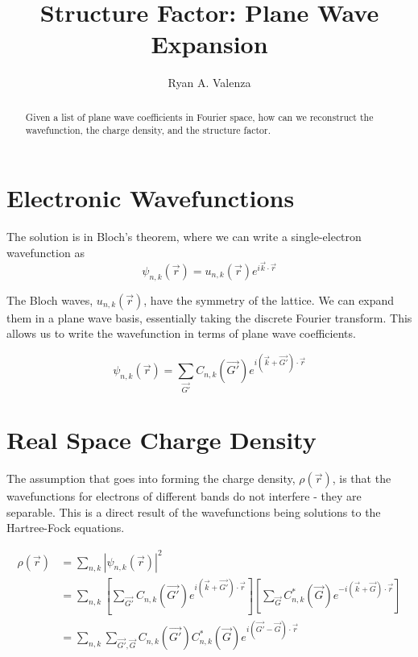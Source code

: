 \documentclass[notitlepage,letter,preprint,prb]{revtex4}
\begin{document}
	\title{Structure Factor: Plane Wave Expansion}
	\author{Ryan A. Valenza}
\nopagebreak
\begin{abstract}
	Given a list of plane wave coefficients in Fourier space, how can we reconstruct the wavefunction, the charge density, and the structure factor.
\end{abstract}
\maketitle 

\section{Electronic Wavefunctions}
	The solution is in Bloch's theorem, where we can write a single-electron wavefunction as
	\begin{equation}
	\psi_{n,k}(\vec{r}) = u_{n,k}(\vec{r})e^{i\vec{k}\cdot\vec{r}}
	\end{equation}
	
	The Bloch waves, $u_{n,k}(\vec{r})$, have the symmetry of the lattice.  We can expand them in a plane wave basis, essentially taking the discrete Fourier transform.  This allows us to write the wavefunction in terms of plane wave coefficients.
	
	\begin{equation}
	\psi_{n,k}(\vec{r}) = \sum_{\vec{G'}}C_{n,k}(\vec{G'})e^{i(\vec{k}+\vec{G'})\cdot\vec{r}}
	\end{equation}

\section{Real Space Charge Density}
	The assumption that goes into forming the charge density, $\rho(\vec{r})$, is that the wavefunctions for electrons of different bands do not interfere - they are separable.  This is a direct result of the wavefunctions being solutions to the Hartree-Fock equations.  
	
	\begin{align}
	\rho(\vec{r}) &= \sum_{n,k}|{\psi_{n,k}(\vec{r})}|^2 \nonumber \\
	&= \sum_{n,k}[\sum_{\vec{G'}}C_{n,k}(\vec{G'})e^{i(\vec{k}+\vec{G'})\cdot\vec{r}}][\sum_{\vec{G}}C^{*}_{n,k}(\vec{G})e^{-i(\vec{k}+\vec{G})\cdot\vec{r}}] \nonumber \\
	&= \sum_{n,k}\sum_{\vec{G'},\vec{G}}C_{n,k}(\vec{G'})C^{*}_{n,k}(\vec{G})e^{i(\vec{G'}-\vec{G})\cdot\vec{r}}
	\end{align}
	   
\end{document}

